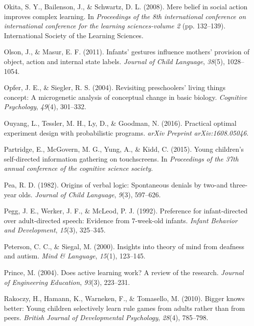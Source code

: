 \documentclass[english,floatsintext,man]{apa6}
\theoremstyle{definition}
\theoremstyle{definition}
\theoremstyle{definition}
\theoremstyle{remark}
\begin{document}
\hypertarget{ref-okita2008mere}{}
Okita, S. Y., Bailenson, J., \& Schwartz, D. L. (2008). Mere belief in
social action improves complex learning. In \emph{Proceedings of the 8th
international conference on international conference for the learning
sciences-volume 2} (pp. 132--139). International Society of the Learning
Sciences.

\hypertarget{ref-olson2011infants}{}
Olson, J., \& Masur, E. F. (2011). Infants' gestures influence mothers'
provision of object, action and internal state labels. \emph{Journal of
Child Language}, \emph{38}(5), 1028--1054.

\hypertarget{ref-opfer2004revisiting}{}
Opfer, J. E., \& Siegler, R. S. (2004). Revisiting preschoolers' living
things concept: A microgenetic analysis of conceptual change in basic
biology. \emph{Cognitive Psychology}, \emph{49}(4), 301--332.

\hypertarget{ref-ouyang2016practical}{}
Ouyang, L., Tessler, M. H., Ly, D., \& Goodman, N. (2016). Practical
optimal experiment design with probabilistic programs. \emph{arXiv
Preprint arXiv:1608.05046}.

\hypertarget{ref-partridge2015young}{}
Partridge, E., McGovern, M. G., Yung, A., \& Kidd, C. (2015). Young
children's self-directed information gathering on touchscreens. In
\emph{Proceedings of the 37th annual conference of the cognitive science
society}.

\hypertarget{ref-pea1982origins}{}
Pea, R. D. (1982). Origins of verbal logic: Spontaneous denials by
two-and three-year olds. \emph{Journal of Child Language}, \emph{9}(3),
597--626.

\hypertarget{ref-pegg1992preference}{}
Pegg, J. E., Werker, J. F., \& McLeod, P. J. (1992). Preference for
infant-directed over adult-directed speech: Evidence from 7-week-old
infants. \emph{Infant Behavior and Development}, \emph{15}(3), 325--345.

\hypertarget{ref-peterson2000insights}{}
Peterson, C. C., \& Siegal, M. (2000). Insights into theory of mind from
deafness and autism. \emph{Mind \& Language}, \emph{15}(1), 123--145.

\hypertarget{ref-prince2004does}{}
Prince, M. (2004). Does active learning work? A review of the research.
\emph{Journal of Engineering Education}, \emph{93}(3), 223--231.

\hypertarget{ref-rakoczy2010bigger}{}
Rakoczy, H., Hamann, K., Warneken, F., \& Tomasello, M. (2010). Bigger
knows better: Young children selectively learn rule games from adults
rather than from peers. \emph{British Journal of Developmental
Psychology}, \emph{28}(4), 785--798.
\end{document}

